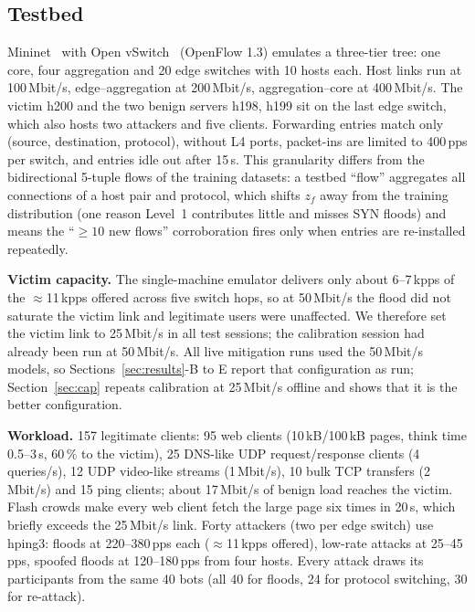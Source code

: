 \documentclass[conference]{IEEEtran}
\begin{document}
\subsection{Testbed}
Mininet~\cite{lantz2010network} with Open vSwitch~\cite{pfaff2015ovs} (OpenFlow 1.3) emulates a three-tier tree: one core, four aggregation and 20 edge switches with 10 hosts each. Host links run at 100\,Mbit/s, edge--aggregation at 200\,Mbit/s, aggregation--core at 400\,Mbit/s. The victim h200 and the two benign servers h198, h199 sit on the last edge switch, which also hosts two attackers and five clients. Forwarding entries match only (source, destination, protocol), without L4 ports, packet-ins are limited to 400\,pps per switch, and entries idle out after 15\,s. This granularity differs from the bidirectional 5-tuple flows of the training datasets: a testbed ``flow'' aggregates all connections of a host pair and protocol, which shifts $z_f$ away from the training distribution (one reason Level~1 contributes little and misses SYN floods) and means the ``$\ge10$ new flows'' corroboration fires only when entries are re-installed repeatedly.

\textbf{Victim capacity.} The single-machine emulator delivers only about 6--7\,kpps of the $\approx$11\,kpps offered across five switch hops, so at 50\,Mbit/s the flood did not saturate the victim link and legitimate users were unaffected. We therefore set the victim link to 25\,Mbit/s in all test sessions; the calibration session had already been run at 50\,Mbit/s. All live mitigation runs used the 50\,Mbit/s models, so Sections~\ref{sec:results}-B to E report that configuration as run; Section~\ref{sec:cap} repeats calibration at 25\,Mbit/s offline and shows that it is the better configuration.

\textbf{Workload.} 157 legitimate clients: 95 web clients (10\,kB/100\,kB pages, think time 0.5--3\,s, 60\,\% to the victim), 25 DNS-like UDP request/response clients (4 queries/s), 12 UDP video-like streams (1\,Mbit/s), 10 bulk TCP transfers (2\,Mbit/s) and 15 ping clients; about 17\,Mbit/s of benign load reaches the victim. Flash crowds make every web client fetch the large page six times in 20\,s, which briefly exceeds the 25\,Mbit/s link. Forty attackers (two per edge switch) use hping3: floods at 220--380\,pps each ($\approx$11\,kpps offered), low-rate attacks at 25--45\,pps, spoofed floods at 120--180\,pps from four hosts. Every attack draws its participants from the same 40 bots (all 40 for floods, 24 for protocol switching, 30 for re-attack).
\end{document}
